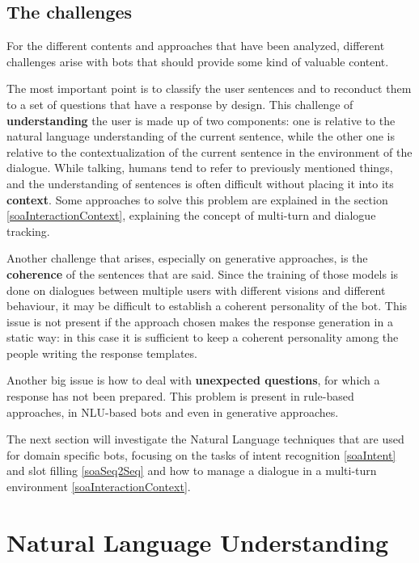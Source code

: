 \subsection{The challenges}
\label{soaChallenges}

For the different contents and approaches that have been analyzed, different challenges arise with bots that should provide some kind of valuable content.

The most important point is to classify the user sentences and to reconduct them to a set of questions that have a response by design. This challenge of \textbf{understanding} the user is made up of two components: one is relative to the natural language understanding of the current sentence, while the other one is relative to the contextualization of the current sentence in the environment of the dialogue. While talking, humans tend to refer to previously mentioned things, and the understanding of sentences is often difficult without placing it into its \textbf{context}. Some approaches to solve this problem are explained in the section \ref{soaInteractionContext}, explaining the concept of multi-turn and dialogue tracking.

Another challenge that arises, especially on generative approaches, is the \textbf{coherence} of the sentences that are said. Since the training of those models is done on dialogues between multiple users with different visions and different behaviour, it may be difficult to establish a coherent personality of the bot. This issue is not present if the approach chosen makes the response generation in a static way: in this case it is sufficient to keep a coherent personality among the people writing the response templates.

Another big issue is how to deal with \textbf{unexpected questions}, for which a response has not been prepared. This problem is present in rule-based approaches, in NLU-based bots and even in generative approaches.

The next section will investigate the Natural Language techniques that are used for domain specific bots, focusing on the tasks of intent recognition \ref{soaIntent} and slot filling \ref{soaSeq2Seq} and how to manage a dialogue in a multi-turn environment \ref{soaInteractionContext}.

\section{Natural Language Understanding}
\label{soaNLU}

